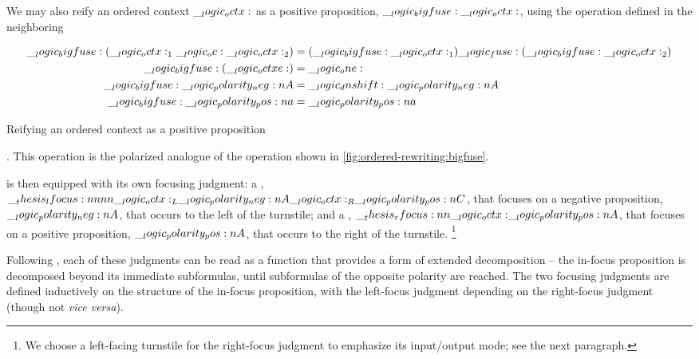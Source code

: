 We may also reify an ordered context $\__logic_octx:$ as a positive proposition, $\__logic_bigfuse: \__logic_octx:$, using the operation defined in the neighboring %
%
\begin{marginfigure}[-6\baselineskip]
  \begin{align*}
    \__logic_bigfuse: (\__logic_octx:_1 \__logic_oc: \__logic_octx:_2) &= (\__logic_bigfuse: \__logic_octx:_1) \__logic_fuse: (\__logic_bigfuse: \__logic_octx:_2) \\
    \__logic_bigfuse: (\__logic_octxe:) &= \__logic_one: \\
    \__logic_bigfuse: \__logic_polarity_neg:n {A} &= \__logic_dnshift: \__logic_polarity_neg:n {A} \\
    \__logic_bigfuse: \__logic_polarity_pos:n {a} &= \__logic_polarity_pos:n {a}
  \end{align*}
  \caption{Reifying an ordered context as a positive proposition}\label{fig:ordered-rewriting:polarized-bigfuse}
\end{marginfigure}%
%
.
This operation is the polarized analogue of the operation shown in \cref{fig:ordered-rewriting:bigfuse}.

 is then equipped with its own focusing judgment: a , $\__thesis_lfocus:nnnn {\__logic_octx:_L} {\__logic_polarity_neg:n {A}} {\__logic_octx:_R} {\__logic_polarity_pos:n {C}}$, that focuses on a negative proposition, $\__logic_polarity_neg:n {A}$, that occurs to the left of the turnstile; and a , $\__thesis_rfocus:nn {\__logic_octx:} {\__logic_polarity_pos:n {A}}$, that focuses on a positive proposition, $\__logic_polarity_pos:n {A}$, that occurs to the right of the turnstile.%
\footnote[][-1.5\baselineskip]{We choose a left-facing turnstile for the right-focus judgment to emphasize its input/output mode; see the next paragraph.}

Following , each of these judgments can be read as a function that provides a form of extended decomposition -- the in-focus proposition is decomposed beyond its immediate subformulas, until subformulas of the opposite polarity are reached.
% 
The two focusing judgments are defined inductively on the structure of the in-focus proposition, with the left-focus judgment depending on the right-focus judgment (though not \emph{vice versa}).

